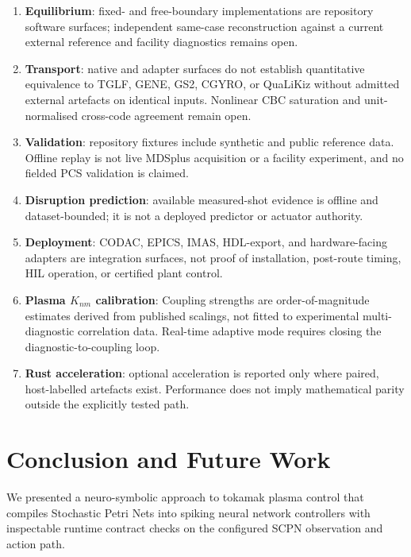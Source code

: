 \documentclass[twocolumn,preprintnumbers,amsmath,amssymb,prl,floatfix]{revtex4-2}
\begin{document}
\begin{enumerate}
  \item \textbf{Equilibrium}: fixed- and free-boundary implementations are
    repository software surfaces; independent same-case reconstruction against
    a current external reference and facility diagnostics remains open.
  \item \textbf{Transport}: native and adapter surfaces do not establish
    quantitative equivalence to TGLF, GENE, GS2, CGYRO, or QuaLiKiz without
    admitted external artefacts on identical inputs. Nonlinear CBC saturation
    and unit-normalised cross-code agreement remain open.
  \item \textbf{Validation}: repository fixtures include synthetic and public
    reference data. Offline replay is not live MDSplus acquisition or a facility
    experiment, and no fielded PCS validation is claimed.
  \item \textbf{Disruption prediction}: available measured-shot evidence is
    offline and dataset-bounded; it is not a deployed predictor or actuator
    authority.
  \item \textbf{Deployment}: CODAC, EPICS, IMAS, HDL-export, and hardware-facing
    adapters are integration surfaces, not proof of installation, post-route
    timing, HIL operation, or certified plant control.
  \item \textbf{Plasma $K_{nm}$ calibration}: Coupling strengths
    are order-of-magnitude estimates derived from published
    scalings, not fitted to experimental multi-diagnostic
    correlation data.  Real-time adaptive mode requires
    closing the diagnostic-to-coupling loop.
  \item \textbf{Rust acceleration}: optional acceleration is reported only
    where paired, host-labelled artefacts exist. Performance does not imply
    mathematical parity outside the explicitly tested path.
\end{enumerate}


\section{Conclusion and Future Work}
\label{sec:conclusion}

We presented a neuro-symbolic approach to tokamak plasma control
that compiles Stochastic Petri Nets into spiking neural network
controllers with inspectable runtime contract checks on the configured
SCPN observation and action path.
\end{document}
